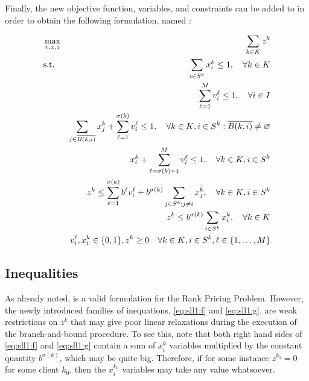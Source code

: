 Finally, the new objective function, variables, and constraints can be added to
\slnl in order to obtain the following formulation, named \slla:
{
    \newcommand{\bover}   {\overline{B(k, i)}}
    \newcommand{\bne}     {\bover\neq\varnothing}
    \newcommand{\sumk}    {\sum_{\kk}}
    \newcommand{\sumi}    {\sum_{\is}}
    \newcommand{\sumlm}   {\sum_{\ell=1}^{M}}
    \newcommand{\sumj}    {\sum_{j\in\bover}}
    \newcommand{\sumls}   {\sum_{\ell=1}^{\sigma(k)}}
    \newcommand{\sumlsm}  {\sum_{\ell=\sigma(k)+1}^{M}}
    \newcommand{\sumjneq} {\sum_{j \in S^k : j \neq i}}
    
    \begin{eqnarray}
        &\max_{v, x, z}
             & \sumk z^k                                                \label{eq:sll1:a}\\
        &\text{s.t.}
             & \sumi  x_i^k                  \leq 1, \quad\forall\kk    \label{eq:sll1:b}\\
        &    & \sumlm v_i^\ell               \leq 1, \quad\forall\ii    \label{eq:sll1:c}\\
        &    & \sumj x_j^k + \sumls v_i^\ell \leq 1, \quad\forall\kk,\is:\bne
                                                                        \label{eq:sll1:d}\\
        &    & x_i^k + \sumlsm v_i^\ell      \leq 1, \quad\forall\kk,\is\label{eq:sll1:e}\\
        &    & z^k \leq \sumls b^\ell v_i^\ell + b^{\sigma(k)}\sumjneq x_j^k,
                                                     \quad\forall\kk,\is\label{eq:sll1:f}\\
        &    & z^k \leq b^{\sigma(k)}\sumi x_i^k,    \quad\forall\kk    \label{eq:sll1:g}\\
        &    & v_i^\ell, x_i^k \in \binset, z^k\geq 0\quad\forall\kk,\is,\lm
                                                                       \label{eq:sll1:h}
    \end{eqnarray}
}

\subsection{Inequalities} %
\label{ssc:las:sll1:inequalities}

As already noted, \slla is a valid formulation for the Rank Pricing Problem.
However, the newly introduced families of inequations, \eqref{eq:sll1:f} and
\eqref{eq:sll1:g}, are weak restrictions on $z^k$ that may give poor linear
relaxations during the execution of the branch-and-bound procedure. To see this,
note that both right hand sides of \eqref{eq:sll1:f} and \eqref{eq:sll1:g}
contain a sum of $x_i^k$ variables multiplied by the constant quantity
$b^{\sigma(k)}$, which may be quite big. Therefore, if for some instance
$z^{k_0} = 0$ for some client $k_0$, then the $x_i^{k_0}$ variables may take any
value whatsoever.

